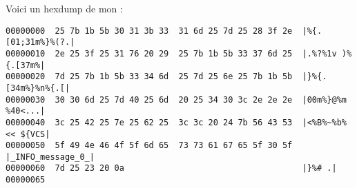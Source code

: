 Voici un hexdump de mon   :

\begin{lstlisting}
00000000  25 7b 1b 5b 30 31 3b 33  31 6d 25 7d 25 28 3f 2e  |%{.[01;31m%}%(?.|
00000010  2e 25 3f 25 31 76 20 29  25 7b 1b 5b 33 37 6d 25  |.%?%1v )%{.[37m%|
00000020  7d 25 7b 1b 5b 33 34 6d  25 7d 25 6e 25 7b 1b 5b  |}%{.[34m%}%n%{.[|
00000030  30 30 6d 25 7d 40 25 6d  20 25 34 30 3c 2e 2e 2e  |00m%}@%m %40<...|
00000040  3c 25 42 25 7e 25 62 25  3c 3c 20 24 7b 56 43 53  |<%B%~%b%<< ${VCS|
00000050  5f 49 4e 46 4f 5f 6d 65  73 73 61 67 65 5f 30 5f  |_INFO_message_0_|
00000060  7d 25 23 20 0a                                    |}%# .|
00000065
\end{lstlisting}
